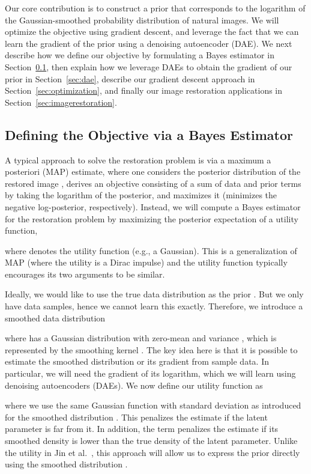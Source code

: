 \documentclass{article}
\begin{document}
Our core contribution is to construct a prior that corresponds to the logarithm of the Gaussian-smoothed probability distribution of natural images. We will optimize the objective using gradient descent, and leverage the fact that we can learn the gradient of the prior using a denoising autoencoder (DAE). We next describe how we define our objective by formulating a Bayes estimator in Section~\ref{sec:bayesrisk}, then explain how we leverage DAEs to obtain the gradient of our prior in Section~\ref{sec:dae}, describe our gradient descent approach in Section~\ref{sec:optimization}, and finally our image restoration applications in Section~\ref{sec:imagerestoration}.

\subsection{Defining the Objective via a Bayes Estimator}
\label{sec:bayesrisk}

A typical approach to solve the restoration problem is via a maximum a posteriori (MAP) estimate, where one considers the posterior distribution of the restored image , derives an objective consisting of a sum of data and prior terms by taking the logarithm of the posterior, and maximizes it (minimizes the negative log-posterior, respectively). Instead, we will compute a Bayes estimator  for the restoration problem by maximizing the posterior expectation of a utility function,

where  denotes the utility function (e.g., a Gaussian). This is a generalization of MAP (where the utility is a Dirac impulse) and the utility function typically encourages its two arguments to be similar.

Ideally, we would like to use the true data distribution as the prior . But we only have data samples, hence we cannot learn this exactly. Therefore, we introduce a smoothed data distribution 

where  has a Gaussian distribution with zero-mean and variance , which is represented by the smoothing kernel . The key idea here is that it is possible to estimate the smoothed distribution  or its gradient from sample data.
In particular, we will need the gradient of its logarithm, which 
we will learn using denoising autoencoders (DAEs). We now define our utility function as

where we use the same Gaussian function  with standard deviation  as introduced for the smoothed distribution . 
This penalizes the estimate  if the latent parameter  is far from it. In addition, the term  penalizes the estimate if its smoothed density is lower than the true density of the latent parameter. 
Unlike the utility in Jin et al.~\cite{Jin:2017:NBD}, this approach will allow us to express the prior directly using the smoothed distribution .
\end{document}
